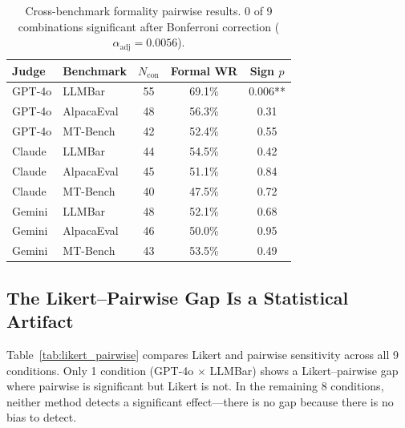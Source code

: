 \documentclass[11pt,a4paper]{article}
\begin{document}
\begin{table}[t]
\centering
\small
\caption{Cross-benchmark formality pairwise results. 0 of 9 combinations significant after Bonferroni correction ($\alpha_{\text{adj}} = 0.0056$).}
\label{tab:crossbench}
\begin{tabular}{llccc}
\toprule
\textbf{Judge} & \textbf{Benchmark} & \textbf{$N_{\text{con}}$} & \textbf{Formal WR} & \textbf{Sign $p$} \\
\midrule
GPT-4o & LLMBar & 55 & 69.1\% & 0.006** \\
GPT-4o & AlpacaEval & 48 & 56.3\% & 0.31 \\
GPT-4o & MT-Bench & 42 & 52.4\% & 0.55 \\
Claude & LLMBar & 44 & 54.5\% & 0.42 \\
Claude & AlpacaEval & 45 & 51.1\% & 0.84 \\
Claude & MT-Bench & 40 & 47.5\% & 0.72 \\
Gemini & LLMBar & 48 & 52.1\% & 0.68 \\
Gemini & AlpacaEval & 46 & 50.0\% & 0.95 \\
Gemini & MT-Bench & 43 & 53.5\% & 0.49 \\
\bottomrule
\end{tabular}
\end{table}

\subsection{The Likert--Pairwise Gap Is a Statistical Artifact}
\label{sec:likert}

Table~\ref{tab:likert_pairwise} compares Likert and pairwise sensitivity across all 9 conditions. Only 1 condition (GPT-4o $\times$ LLMBar) shows a Likert--pairwise gap where pairwise is significant but Likert is not. In the remaining 8 conditions, neither method detects a significant effect---there is no gap because there is no bias to detect.
\end{document}
